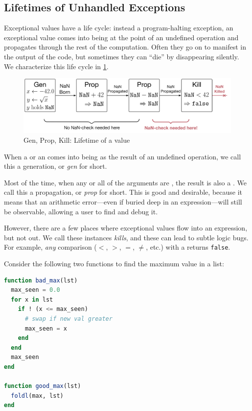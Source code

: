 \documentclass{juliacon}
\begin{document}
\subsection{Lifetimes of Unhandled Exceptions}
\label{s:to-kill-a-fp}

Exceptional values have a life cycle: instead a program-halting exception, an exceptional value comes into being at the point of an undefined operation and propagates through the rest of the computation.
Often they go on to manifest in the output of the code, but sometimes they can ``die'' by disappearing silently.
We characterize this life cycle in \cref{f:gpk}.

\begin{figure}[ht]
  \includegraphics[width=\columnwidth]{fig/genpropkill-outline.png}
  \caption{Gen, Prop, Kill: Lifetime of a \NaN{} value}
  \label{f:gpk}
\end{figure}

When a \NaN{} or an \Inf{} comes into being as the result of an undefined operation, we call this a generation, or \emph{gen} for short.

Most of the time, when any or all of the arguments are \NaN{}, the result is also a \NaN{}.
We call this a propagation, or \emph{prop} for short.
This is good and desirable, because it means that an arithmetic error---even if buried deep in an expression---will still be observable, allowing a user to find and debug it.

However, there are a few places where exceptional values flow into an expression, but not out.
We call these instances \emph{kills}, and these can lead to subtle logic bugs.
For example, \emph{any} comparison ($<$, $>$, $=$, $\neq$, etc.) with a \NaN{} returns \texttt{false}.

Consider the following two functions to find the maximum value in a list:

\begin{lstlisting}[language = Julia]
function bad_max(lst)
  max_seen = 0.0
  for x in lst
    if ! (x <= max_seen)
      # swap if new val greater
      max_seen = x
    end
  end
  max_seen
end

function good_max(lst)
  foldl(max, lst)
end
\end{lstlisting}
\end{document}
